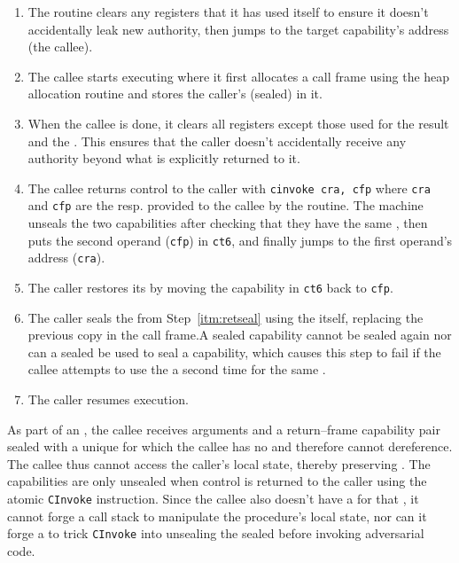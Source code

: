 \documentclass[main.tex]{subfiles}
\begin{document}
\begin{enumerate}
	\item The routine clears any registers that it has used itself to ensure it doesn't accidentally leak new authority, then jumps to the target capability's address (the callee).
	
	\item The callee starts executing where it first allocates a call frame using the heap allocation routine and stores the caller's (sealed)  in it.
	
	\item When the callee is done, it clears all registers except those used for the result and the . This ensures that the caller doesn't accidentally receive any authority beyond what is explicitly returned to it.
	
	\item The callee returns control to the caller with \hbox{\texttt{cinvoke cra, cfp}} where \texttt{cra} and \texttt{cfp} are the  resp.  provided to the callee by the  routine. The machine unseals the two capabilities after checking that they have the same , then puts the second operand (\texttt{cfp}) in \texttt{ct6}, and finally jumps to the first operand's address (\texttt{cra}).
	
	\item The caller restores its  by moving the capability in \texttt{ct6} back to \texttt{cfp}.
	
	\item The caller seals the  from Step~\ref{itm:retseal} using the  itself, replacing the previous copy in the call frame.\footnotemark[\value{footnote}] A sealed capability cannot be sealed again nor can a sealed  be used to seal a capability, which causes this step to fail if the callee attempts to use the  a second time for the same .
	
	\item The caller resumes execution.
	
\end{enumerate}

As part of an , the callee receives arguments and a return–frame capability pair sealed with a unique  for which the callee has no  and therefore cannot dereference. The callee thus cannot access the caller's local state, thereby preserving . The capabilities are only unsealed when control is returned to the caller using the atomic \texttt{CInvoke} instruction. Since the callee also doesn't have a  for that , it cannot forge a call stack to manipulate the procedure's local state, nor can it forge a  to trick \texttt{CInvoke} into unsealing the sealed  before invoking adversarial code.
\end{document}
